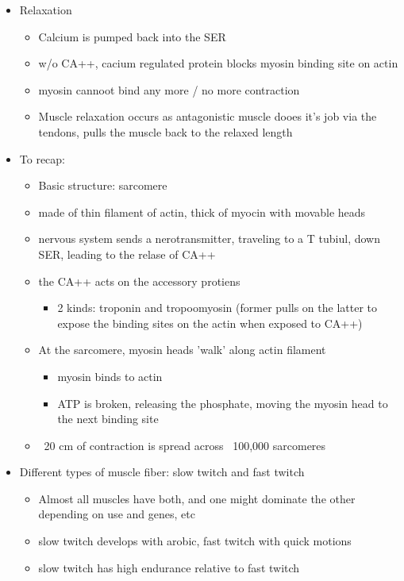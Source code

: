 \documentclass{article}
\theoremstyle{definition}
\begin{document}
\begin{itemize}
	\item Relaxation
		\begin{itemize}
			\item Calcium is pumped back into the SER
			\item w/o CA++, cacium regulated protein blocks myosin binding site on actin
			\item myosin cannoot bind any more / no more contraction
			\item Muscle relaxation occurs as antagonistic muscle dooes it's job via the tendons, pulls the muscle back to the relaxed length
		\end{itemize}
	\item To recap:
		\begin{itemize}
			\item Basic structure: sarcomere
			\item made of thin filament of actin, thick of myocin with movable heads
			\item nervous system sends a nerotransmitter, traveling to a T tubiul, down SER, leading to the relase of CA++
			\item the CA++ acts on the accessory protiens
				\begin{itemize}
					\item 2 kinds: troponin and tropoomyosin (former pulls on the latter to expose the binding sites on the actin when exposed to CA++)
				\end{itemize}
			\item At the sarcomere, myosin heads 'walk' along actin filament
				\begin{itemize}
					\item myosin binds to actin
					\item ATP is broken, releasing the phosphate, moving the myosin head to the next binding site
				\end{itemize}
			\item ~20 cm of contraction is spread across ~100,000 sarcomeres
		\end{itemize}
	\item Different types of muscle fiber: slow twitch and fast twitch
		\begin{itemize}
			\item Almost all muscles have both, and one might dominate the other depending on use and genes, etc
			\item slow twitch develops with arobic, fast twitch with quick motions
			\item slow twitch has high endurance relative to fast twitch

\end{itemize}
\end{itemize}
\end{document}
